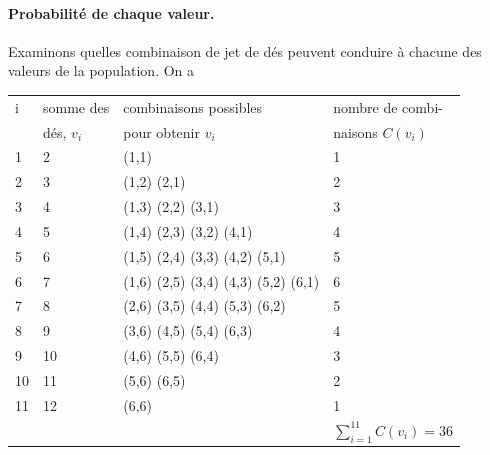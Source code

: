 \paragraph{Probabilité de chaque valeur.} Examinons quelles combinaison de jet de dés peuvent conduire à chacune des valeurs de la population. On a
\begin{center}
\begin{tabular}{llll}
i & somme des & combinaisons possibles & nombre de combi- \\
& dés, $v_i$ & pour obtenir $v_i$ & naisons $C(v_i)$\\ \hline
1 & 2 & (1,1) & 1 \\
2 & 3 & (1,2) (2,1) & 2 \\
3 & 4 & (1,3) (2,2) (3,1) & 3 \\
4 & 5 & (1,4) (2,3) (3,2) (4,1) & 4 \\
5 & 6 & (1,5) (2,4) (3,3) (4,2) (5,1) & 5 \\
6 & 7 & (1,6) (2,5) (3,4) (4,3) (5,2) (6,1) & 6\\
7 & 8 & (2,6) (3,5) (4,4) (5,3) (6,2) & 5 \\
8 & 9 & (3,6) (4,5) (5,4) (6,3) & 4 \\
9 & 10 & (4,6) (5,5) (6,4) & 3 \\
10 & 11 & (5,6) (6,5) & 2 \\
11 & 12 & (6,6) & 1 \\\hline
& & & $\sum_{i=1}^{11}C(v_i)=36$
\end{tabular}
\end{center}

